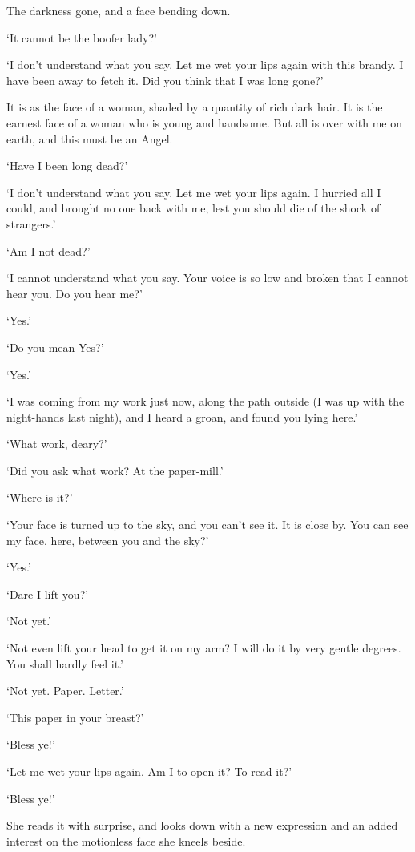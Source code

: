 The darkness gone, and a face bending down.

‘It cannot be the boofer lady?’

‘I don’t understand what you say. Let me wet your lips again with this
brandy. I have been away to fetch it. Did you think that I was long
gone?’

It is as the face of a woman, shaded by a quantity of rich dark hair.
It is the earnest face of a woman who is young and handsome. But all is
over with me on earth, and this must be an Angel.

‘Have I been long dead?’

‘I don’t understand what you say. Let me wet your lips again. I hurried
all I could, and brought no one back with me, lest you should die of the
shock of strangers.’

‘Am I not dead?’

‘I cannot understand what you say. Your voice is so low and broken that
I cannot hear you. Do you hear me?’

‘Yes.’

‘Do you mean Yes?’

‘Yes.’

‘I was coming from my work just now, along the path outside (I was up
with the night-hands last night), and I heard a groan, and found you
lying here.’

‘What work, deary?’

‘Did you ask what work? At the paper-mill.’

‘Where is it?’

‘Your face is turned up to the sky, and you can’t see it. It is close
by. You can see my face, here, between you and the sky?’

‘Yes.’

‘Dare I lift you?’

‘Not yet.’

‘Not even lift your head to get it on my arm? I will do it by very
gentle degrees. You shall hardly feel it.’

‘Not yet. Paper. Letter.’

‘This paper in your breast?’

‘Bless ye!’

‘Let me wet your lips again. Am I to open it? To read it?’

‘Bless ye!’

She reads it with surprise, and looks down with a new expression and an
added interest on the motionless face she kneels beside.


